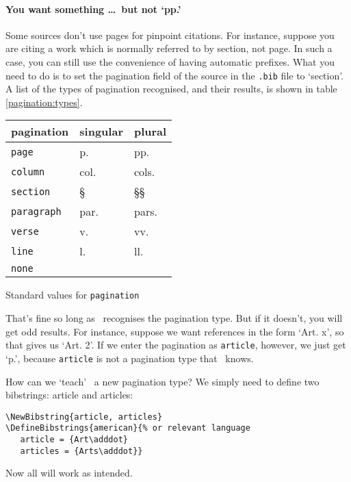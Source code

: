 \paragraph{You want something \ldots\ but not `pp.'} Some sources
don't use pages for pinpoint citations. For instance, suppose you are
citing a work which is normally referred to by section, not page. In
such a case, you can still use the convenience of having automatic
prefixes. What you need to do is to set the pagination field of the
source in the \texttt{.bib} file to `section'. A list of the types of
pagination recognised, and their results, is shown in table
\ref{pagination:types}.
\begin{margintable}
\begin{tabular}{lll}
  \toprule
  \textsf{pagination} & \textsf{singular} & \textsf{plural} \\
  \midrule
  \texttt{page}       & p.                & pp.             \\
  \texttt{column}     & col.              & cols.           \\
  \texttt{section}    & \S                & \S\S            \\
  \texttt{paragraph}  & par.              & pars.           \\
  \texttt{verse}      & v.                & vv.             \\
  \texttt{line}       & l.                & ll.             \\
  \texttt{none}                                             \\
  \bottomrule
\end{tabular}
\vspace{3pt}
\caption{Standard values for \texttt{pagination}\label{pagination:types}}
\end{margintable}


That’s fine so long as \biblatex\ recognises the pagination type. But if
it doesn’t, you will get odd results. For instance, suppose we want
references in the form `Art. x', so that  gives us
`Art. 2'. If we enter the pagination as \texttt{article}, however, we
just get `p.', because \texttt{article} is not a
pagination type that \biblatex\ knows.

How can we `teach' \biblatex\ a new pagination type? We simply need to
define two bibstrings: article and articles:

\begin{verbatim}
\NewBibstring{article, articles}
\DefineBibstrings{american}{% or relevant language
   article = {Art\adddot}
   articles = {Arts\adddot}}
\end{verbatim}
Now all will work as intended. 

